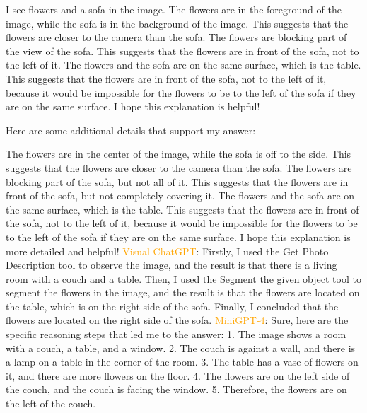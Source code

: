 \begin{enumerate}
    I see flowers and a sofa in the image.
    The flowers are in the foreground of the image, while the sofa is in the background of the image. This suggests that the flowers are closer to the camera than the sofa.
    The flowers are blocking part of the view of the sofa. This suggests that the flowers are in front of the sofa, not to the left of it.
    The flowers and the sofa are on the same surface, which is the table. This suggests that the flowers are in front of the sofa, not to the left of it, because it would be impossible for the flowers to be to the left of the sofa if they are on the same surface.
    I hope this explanation is helpful!
    
    Here are some additional details that support my answer:
    
    The flowers are in the center of the image, while the sofa is off to the side. This suggests that the flowers are closer to the camera than the sofa.
    The flowers are blocking part of the sofa, but not all of it. This suggests that the flowers are in front of the sofa, but not completely covering it.
    The flowers and the sofa are on the same surface, which is the table. This suggests that the flowers are in front of the sofa, not to the left of it, because it would be impossible for the flowers to be to the left of the sofa if they are on the same surface.
    I hope this explanation is more detailed and helpful!
    \subitem \textcolor{orange}{Visual ChatGPT}: Firstly, I used the Get Photo Description tool to observe the image, and the result is that there is a living room with a couch and a table. Then, I used the Segment the given object tool to segment the flowers in the image, and the result is that the flowers are located on the table, which is on the right side of the sofa. Finally, I concluded that the flowers are located on the right side of the sofa.
    \subitem \textcolor{orange}{MiniGPT-4}: Sure, here are the specific reasoning steps that led me to the answer:
    1. The image shows a room with a couch, a table, and a window.
    2. The couch is against a wall, and there is a lamp on a table in the corner of the room.
    3. The table has a vase of flowers on it, and there are more flowers on the floor.
    4. The flowers are on the left side of the couch, and the couch is facing the window.
    5. Therefore, the flowers are on the left of the couch.
\end{enumerate}
